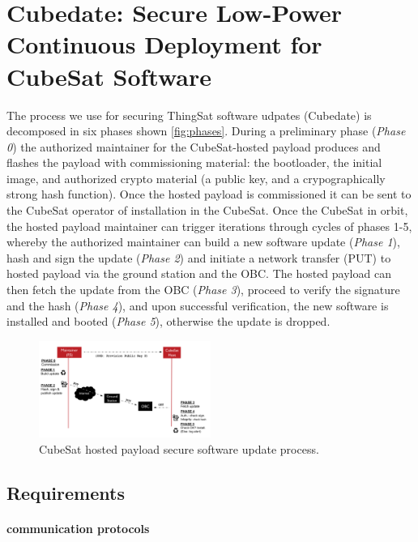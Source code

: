 \section{Cubedate: Secure Low-Power Continuous Deployment for CubeSat Software}
\label{sec:low-power-orbital-communication-arch}

The process we use for securing ThingSat software udpates (Cubedate) is decomposed in six phases shown \autoref{fig:phases}. During a preliminary phase (\textit{Phase 0}) the authorized maintainer for the CubeSat-hosted payload
produces and flashes the payload with commissioning material:
the bootloader, the initial image, and authorized crypto material (a public key, and a crypographically strong hash function).
Once the hosted payload is commissioned it can be sent to the CubeSat operator of installation in the CubeSat.
Once the CubeSat in orbit, the hosted payload maintainer can trigger iterations through cycles of phases 1-5, whereby
the authorized maintainer can build a new software update (\textit{Phase 1}), hash
and sign the update (\textit{Phase 2}) and initiate a network transfer (PUT) to hosted payload via the ground station and the OBC. The hosted payload can
then fetch the update from the OBC (\textit{Phase 3}), proceed to verify the signature and the hash (\textit{Phase 4}),
and upon successful verification, the new software is installed and
booted (\textit{Phase 5}), otherwise the update is dropped.

\begin{figure}[t]
    \centering
    \includegraphics[width=0.5\textwidth]{Figures/CubeSat-Payload-update.png}
    \caption{CubeSat hosted payload secure software update process.}
    \label{fig:phases}
\end{figure}


\subsection{Requirements}
\paragraph*{communication protocols}

